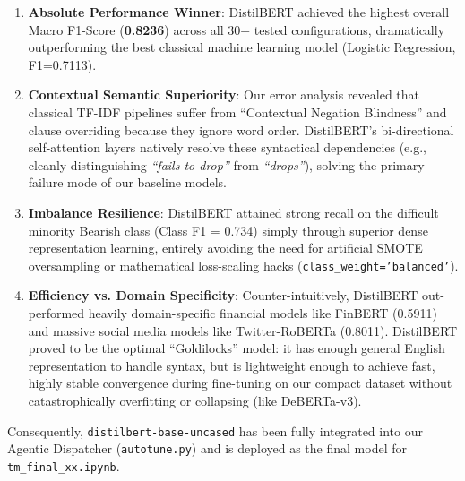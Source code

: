 \documentclass[11pt,a4paper]{article}
\begin{document}
\begin{enumerate}[noitemsep]
    \item \textbf{Absolute Performance Winner}: DistilBERT achieved the highest overall Macro F1-Score (\textbf{0.8236}) across all 30+ tested configurations, dramatically outperforming the best classical machine learning model (Logistic Regression, F1=0.7113).
    \item \textbf{Contextual Semantic Superiority}: Our error analysis revealed that classical TF-IDF pipelines suffer from ``Contextual Negation Blindness'' and clause overriding because they ignore word order. DistilBERT's bi-directional self-attention layers natively resolve these syntactical dependencies (e.g., cleanly distinguishing \textit{``fails to drop''} from \textit{``drops''}), solving the primary failure mode of our baseline models.
    \item \textbf{Imbalance Resilience}: DistilBERT attained strong recall on the difficult minority Bearish class (Class F1 = 0.734) simply through superior dense representation learning, entirely avoiding the need for artificial SMOTE oversampling or mathematical loss-scaling hacks (\texttt{class\_weight='balanced'}).
    \item \textbf{Efficiency vs. Domain Specificity}: Counter-intuitively, DistilBERT out-performed heavily domain-specific financial models like FinBERT (0.5911) and massive social media models like Twitter-RoBERTa (0.8011). DistilBERT proved to be the optimal ``Goldilocks'' model: it has enough general English representation to handle syntax, but is lightweight enough to achieve fast, highly stable convergence during fine-tuning on our compact dataset without catastrophically overfitting or collapsing (like DeBERTa-v3).
\end{enumerate}

Consequently, \texttt{distilbert-base-uncased} has been fully integrated into our Agentic Dispatcher (\texttt{autotune.py}) and is deployed as the final model for \texttt{tm\_final\_xx.ipynb}.
\end{document}
